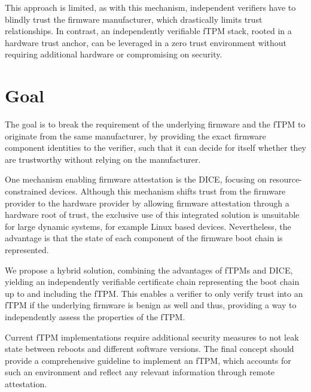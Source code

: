 
This approach is limited, as with this mechanism, independent verifiers have to blindly trust the firmware manufacturer, which drastically limits trust relationships.
In contrast, an independently verifiable fTPM stack, rooted in a hardware trust anchor, can be leveraged in a zero trust environment without requiring additional hardware or compromising on security.

\section{Goal}

The goal is to break the requirement of the underlying firmware and the fTPM to originate from the same manufacturer, by providing the exact firmware component identities to the verifier, such that it can decide for itself whether they are trustworthy without relying on the manufacturer.


One mechanism enabling firmware attestation is the \ac{DICE}, focusing on resource-constrained devices. Although this mechanism shifts trust from the firmware provider to the hardware provider by allowing firmware attestation through a hardware root of trust, the exclusive use of this integrated solution is unsuitable for large dynamic systems, for example Linux based devices.
Nevertheless, the advantage is that the state of each component of the firmware boot chain is represented.


We propose a hybrid solution, combining the advantages of \acp{fTPM} and \ac{DICE}, yielding an independently verifiable certificate chain representing the boot chain up to and including the \ac{fTPM}.
This enables a verifier to only verify trust into an \ac{fTPM} if the underlying firmware is benign as well and thus, providing a way to independently assess the properties of the fTPM.

Current fTPM implementations require additional security measures to not leak state between reboots and different software versions.
The final concept should provide a comprehensive guideline to implement an fTPM, which accounts for such an environment and reflect any relevant information through remote attestation.

